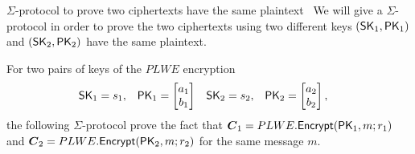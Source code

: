 \begin{section}{$\Sigma$-protocol to prove two ciphertexts have the same plaintext~\label{ProofSamePlaintext}}
  We will give a $\Sigma$-protocol in order to prove the two ciphertexts using two
  different keys $(\mathsf{SK}_1, \mathsf{PK}_1)$ and $(\mathsf{SK}_2, \mathsf{PK}_2)$ have the same plaintext.

  For two pairs of keys of the $PLWE$ encryption
  \begin{align*}
    \mathsf{SK}_1 &= s_1, & \mathsf{PK}_1 &= \begin{bmatrix} a_1 \\ b_1\end{bmatrix} & \mathsf{SK}_2 &= s_2,  & \mathsf{PK}_2 &= \begin{bmatrix} a_2 \\ b_2\end{bmatrix},
  \end{align*}
  the following $\Sigma$-protocol prove the fact that $\vec{C}_1 = PLWE.\Enc(\PK_1, m; r_1)$ and $\vec{C}_2 = PLWE.\Enc(\PK_2, m; r_2)$
  for the same message $m$.


\end{section}
